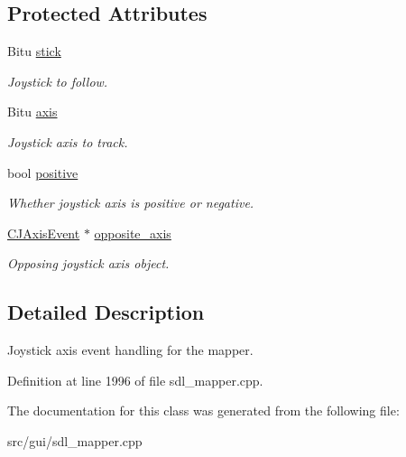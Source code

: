 \subsection*{Protected Attributes}
\begin{DoxyCompactItemize}
\item 
\hypertarget{classCJAxisEvent_a4445db17f0538358d815ab53d449beba}{Bitu \hyperlink{classCJAxisEvent_a4445db17f0538358d815ab53d449beba}{stick}}\label{classCJAxisEvent_a4445db17f0538358d815ab53d449beba}

\begin{DoxyCompactList}\small\item\em Joystick to follow. \end{DoxyCompactList}\item 
\hypertarget{classCJAxisEvent_aef7080ddb8c0a07235865f4f8f33bf90}{Bitu \hyperlink{classCJAxisEvent_aef7080ddb8c0a07235865f4f8f33bf90}{axis}}\label{classCJAxisEvent_aef7080ddb8c0a07235865f4f8f33bf90}

\begin{DoxyCompactList}\small\item\em Joystick axis to track. \end{DoxyCompactList}\item 
\hypertarget{classCJAxisEvent_a90367a0731415ea7dd7b3d01fa153367}{bool \hyperlink{classCJAxisEvent_a90367a0731415ea7dd7b3d01fa153367}{positive}}\label{classCJAxisEvent_a90367a0731415ea7dd7b3d01fa153367}

\begin{DoxyCompactList}\small\item\em Whether joystick axis is positive or negative. \end{DoxyCompactList}\item 
\hypertarget{classCJAxisEvent_aef506ec736efabf7a118af104921a998}{\hyperlink{classCJAxisEvent}{C\-J\-Axis\-Event} $\ast$ \hyperlink{classCJAxisEvent_aef506ec736efabf7a118af104921a998}{opposite\-\_\-axis}}\label{classCJAxisEvent_aef506ec736efabf7a118af104921a998}

\begin{DoxyCompactList}\small\item\em Opposing joystick axis object. \end{DoxyCompactList}\end{DoxyCompactItemize}


\subsection{Detailed Description}
Joystick axis event handling for the mapper. 

Definition at line 1996 of file sdl\-\_\-mapper.\-cpp.



The documentation for this class was generated from the following file\-:\begin{DoxyCompactItemize}
\item 
src/gui/sdl\-\_\-mapper.\-cpp\end{DoxyCompactItemize}

